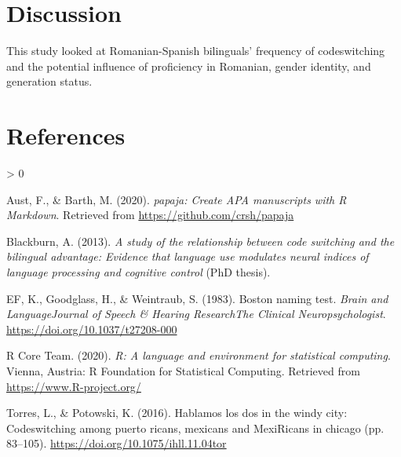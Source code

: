 \documentclass[
  english,
  man]{apa6}
\newlength{\cslhangindent}
\newenvironment{CSLReferences}[2] %
 {%
  \setlength{\parindent}{0pt}
  \ifodd #1 \everypar{\setlength{\hangindent}{\cslhangindent}}\ignorespaces\fi
  \ifnum #2 > 0
  \setlength{\parskip}{#2\baselineskip}
  \fi
 }%
 {}
\begin{document}
\hypertarget{discussion}{%
\section{Discussion}\label{discussion}}

This study looked at Romanian-Spanish bilinguals' frequency of codeswitching and the potential influence of proficiency in Romanian, gender identity, and generation status.

\newpage

\hypertarget{references}{%
\section{References}\label{references}}

\begingroup
\setlength{\parindent}{-0.5in}
\setlength{\leftskip}{0.5in}

\hypertarget{refs}{}
\begin{CSLReferences}{1}{0}
\leavevmode\hypertarget{ref-R-papaja}{}%
Aust, F., \& Barth, M. (2020). \emph{{papaja}: {Create} {APA} manuscripts with {R Markdown}}. Retrieved from \url{https://github.com/crsh/papaja}

\leavevmode\hypertarget{ref-phdthesis}{}%
Blackburn, A. (2013). \emph{A study of the relationship between code switching and the bilingual advantage: Evidence that language use modulates neural indices of language processing and cognitive control} (PhD thesis).

\leavevmode\hypertarget{ref-article}{}%
EF, K., Goodglass, H., \& Weintraub, S. (1983). Boston naming test. \emph{Brain and LanguageJournal of Speech \& Hearing ResearchThe Clinical Neuropsychologist}. \url{https://doi.org/10.1037/t27208-000}

\leavevmode\hypertarget{ref-R-base}{}%
R Core Team. (2020). \emph{R: A language and environment for statistical computing}. Vienna, Austria: R Foundation for Statistical Computing. Retrieved from \url{https://www.R-project.org/}

\leavevmode\hypertarget{ref-inbook}{}%
Torres, L., \& Potowski, K. (2016). Hablamos los dos in the windy city: Codeswitching among puerto ricans, mexicans and MexiRicans in chicago (pp. 83--105). \url{https://doi.org/10.1075/ihll.11.04tor}

\end{CSLReferences}

\endgroup
\end{document}
